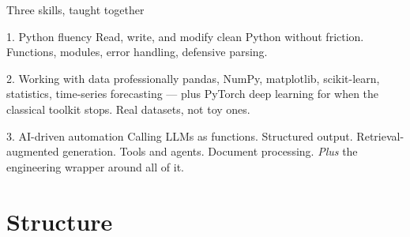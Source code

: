\documentclass[aspectratio=169,11pt]{beamer}
\begin{document}
\begin{frame}{Three skills, taught together}
  \begin{block}{1. Python fluency}
    Read, write, and modify clean Python without friction. Functions, modules, error handling, defensive parsing.
  \end{block}
  \begin{exampleblock}{2. Working with data professionally}
    pandas, NumPy, matplotlib, scikit-learn, statistics, time-series forecasting --- plus PyTorch deep learning for when the classical toolkit stops. Real datasets, not toy ones.
  \end{exampleblock}
  \begin{block}{3. AI-driven automation}
    Calling LLMs as functions. Structured output. Retrieval-augmented generation. Tools and agents. Document processing. \emph{Plus} the engineering wrapper around all of it.
  \end{block}
\end{frame}

\section{Structure}
\end{document}
